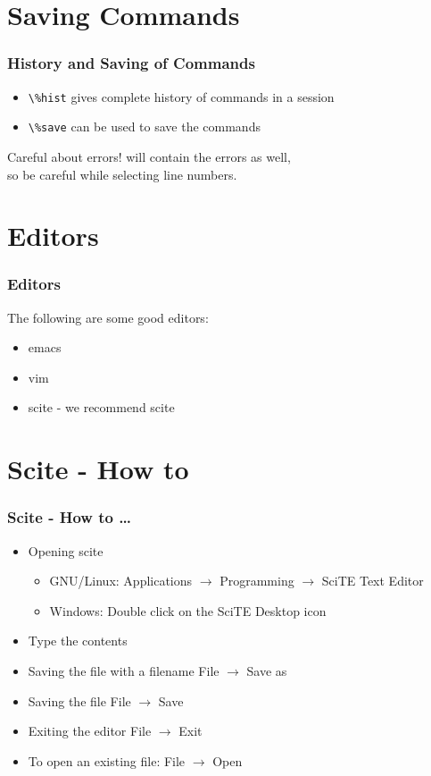 \documentclass[14pt,compress]{beamer}
\newcommand{\typ}[1]{\lstinline{#1}}
\newcommand{\kwrd}[1]{ \texttt{\textbf{\color{blue}{#1}}}  }
\begin{document}
\section{Saving Commands}
\begin{frame}[fragile]
\frametitle{History and Saving of Commands}
\begin{itemize}
\item \typ{\%hist} gives complete history of commands in a session
\item \typ{\%save} can be used to save the commands
\end{itemize}
\begin{block}{Careful about errors!}
  \kwrd{\%hist} will contain the errors as well,\\
  so be careful while selecting line numbers.
\end{block}
\end{frame}

\section{Editors}
\begin{frame}[fragile]
  \frametitle{Editors}
  The following are some good editors:
  \begin{itemize}
  \item emacs
  \item vim
  \item scite - we recommend scite
  \end{itemize}
\end{frame}

\section{Scite - How to}
\begin{frame}[fragile]
  \frametitle{Scite - How to \ldots}
  \begin{itemize}
  \item Opening scite
    \begin{itemize}
    \item GNU/Linux: \alert{Applications} $\rightarrow$ \alert{Programming} $\rightarrow$ \alert{SciTE Text Editor}
    \item Windows: Double click on the \alert{SciTE} Desktop icon
    \end{itemize}
  \item Type the contents
  \item Saving the file with a filename \alert{File $\rightarrow$ Save as}
  \item Saving the file  \alert{File $\rightarrow$ Save}
  \item Exiting the editor  \alert{File $\rightarrow$ Exit}
  \item To open an existing file: \alert{File $\rightarrow$ Open}
  \end{itemize}
\end{frame}
\end{document}

